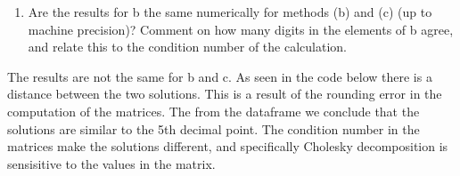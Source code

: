 \documentclass[]{article}
\newenvironment{Shaded}{\begin{snugshade}}{\end{snugshade}}
\newcommand{\DataTypeTok}[1]{\textcolor[rgb]{0.13,0.29,0.53}{#1}}
\newcommand{\DecValTok}[1]{\textcolor[rgb]{0.00,0.00,0.81}{#1}}
\newcommand{\KeywordTok}[1]{\textcolor[rgb]{0.13,0.29,0.53}{\textbf{#1}}}
\newcommand{\NormalTok}[1]{#1}
\newcommand{\OperatorTok}[1]{\textcolor[rgb]{0.81,0.36,0.00}{\textbf{#1}}}
\newcommand{\OtherTok}[1]{\textcolor[rgb]{0.56,0.35,0.01}{#1}}
\newcommand{\StringTok}[1]{\textcolor[rgb]{0.31,0.60,0.02}{#1}}
\providecommand{\tightlist}{%
  \setlength{\itemsep}{0pt}\setlength{\parskip}{0pt}}
\begin{document}
\begin{enumerate}
\def\labelenumi{(\alph{enumi})}
\setcounter{enumi}{1}
\tightlist
\item
  Are the results for b the same numerically for methods (b) and (c) (up
  to machine precision)? Comment on how many digits in the elements of b
  agree, and relate this to the condition number of the calculation.
\end{enumerate}

The results are not the same for b and c. As seen in the code below
there is a distance between the two solutions. This is a result of the
rounding error in the computation of the matrices. The from the
dataframe we conclude that the solutions are similar to the 5th decimal
point. The condition number in the matrices make the solutions
different, and specifically Cholesky decomposition is sensisitive to the
values in the matrix.

\begin{Shaded}
\end{Shaded}
\end{document}
